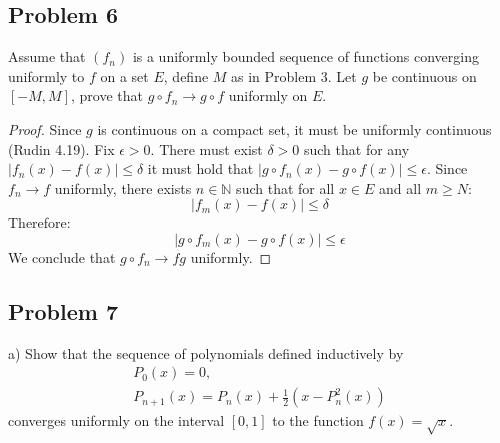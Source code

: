 \documentclass{article}
\newcommand{\N}{\mathbb{N}}
\begin{document}
\subsection*{Problem 6}

\begin{tcolorbox}
Assume that $(f_n)$ is a uniformly bounded sequence of functions converging uniformly to $f$ on a set $E$, define $M$ as in Problem 3.
Let $g$ be continuous on $[-M, M]$, prove that $g \circ f_n \to g \circ f$ uniformly on $E$.
\end{tcolorbox}

\begin{proof}

Since $g$ is continuous on a compact set, it must be uniformly continuous (Rudin 4.19).
Fix $\epsilon>0$. There must exist $\delta>0$ such that for any $|f_n(x)-f(x)| \leq \delta$ it must hold that $|g \circ f_n(x)-g \circ f(x)| \leq \epsilon$.
Since $f_n \to f$ uniformly, there exists $n \in \N$ such that for all $x \in E$ and all $m \geq N$:
\[ |f_m(x)-f(x)| \leq \delta \]
Therefore:
\[ |g \circ f_m(x)-g \circ f(x)| \leq \epsilon \]
We conclude that $g \circ f_n \to f g$ uniformly.
\end{proof}


\subsection*{Problem 7}

\begin{tcolorbox}
a) Show that the sequence of polynomials defined inductively by
\begin{gather*}
    P_0(x) = 0, \\
    P_{n+1}(x) = P_n(x) + \frac{1}{2} \left( x-P_n^2(x) \right)    
\end{gather*}
converges uniformly on the interval $[0, 1]$ to the function $f(x) = \sqrt{x}$.
\end{tcolorbox}
\end{document}
